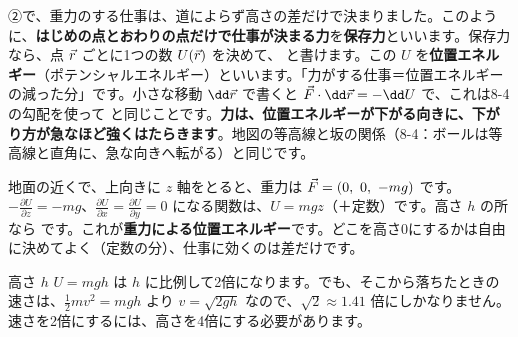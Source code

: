 \label{ph:力-4:sec6}
②で、重力のする仕事は、道によらず高さの差だけで決まりました。このように、\textbf{はじめの点とおわりの点だけで仕事が決まる力}を\textbf{保存力}といいます。保存力なら、点 $\vec{r}$ ごとに1つの数 $U(\vec{r})$ を決めて、
と書けます。この $U$ を\textbf{位置エネルギー}（ポテンシャルエネルギー）といいます。「力がする仕事＝位置エネルギーの減った分」です。小さな移動 $\dd\pxev r$ で書くと $\pxev F\cdot\dd\pxev r=-\dd U$ で、これは8-4の勾配を使って
と同じことです。\textbf{力は、位置エネルギーが下がる向きに、下がり方が急なほど強くはたらきます}。地図の等高線と坂の関係（8-4：ボールは等高線と直角に、急な向きへ転がる）と同じです。

地面の近くで、上向きに $z$ 軸をとると、重力は $\pxev F=(0,\ 0,\ -mg)$ です。$-\tfrac{\partial U}{\partial z}=-mg$、$\tfrac{\partial U}{\partial x}=\tfrac{\partial U}{\partial y}=0$ になる関数は、$U=mgz$（＋定数）です。高さ $h$ の所なら
\label{ph:力-4:mgh}です。これが\textbf{重力による位置エネルギー}です。どこを高さ0にするかは自由に決めてよく（定数の分）、仕事に効くのは差だけです。

\begin{phbaisuru}{高さ $h$}
$U=mgh$ は $h$ に比例して2倍になります。でも、そこから落ちたときの速さは、$\tfrac{1}{2}mv^2=mgh$ より $v=\sqrt{2gh}$ なので、$\sqrt2\approx1.41$ 倍にしかなりません。速さを2倍にするには、高さを4倍にする必要があります。
\par\smallskip\noindent{}
\end{phbaisuru}


